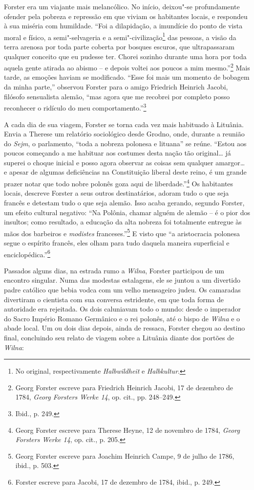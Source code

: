 Forster era um viajante mais melancólico. No início, deixou"-se
profundamente ofender pela pobreza e repressão em que viviam os
habitantes locais, e respondeu à sua miséria com humildade. ``Foi a
dilapidação, a imundície do ponto de vista moral e físico, a
semi"-selvageria e a semi"-civilização\footnote{No original, respectivamente \textit{Halbwildheit} e \textit{Halbkultur}.} das pessoas, a visão da terra arenosa por toda
parte coberta por bosques escuros, que ultrapassaram qualquer conceito
que eu pudesse ter. Chorei sozinho durante uma hora por toda aquela
gente atirada ao abismo -- e depois voltei aos poucos a mim
mesmo.''\footnote{Georg Forster escreve para Friedrich Heinrich Jacobi, 17 de dezembro de 1784, \textit{Georg Forsters Werke 14}, op. cit., pp. 248--249.} Mais tarde, as emoções haviam se modificado. ``Esse foi mais um momento de bobagem da minha parte,'' observou Forster para o amigo
Friedrich Heinrich Jacobi, filósofo sensualista alemão, ``mas agora que
me recobrei por completo posso reconhecer o ridículo do meu
comportamento.''\footnote{Ibid., p. 249.}

A cada dia de sua viagem, Forster se torna cada vez mais habituado à
Lituânia. Envia a Therese um relatório sociológico desde Grodno, onde,
durante a reunião do \textit{Sejm}, o parlamento, ``toda a nobreza polonesa e
lituana'' se reúne. ``Estou aos poucos começando a me habituar aos
costumes desta nação tão original\ldots{} já superei o choque inicial e
posso agora observar as coisas sem qualquer amargor\ldots{} e
apesar de algumas deficiências na Constituição liberal deste reino, é um
grande prazer notar que todo nobre polonês goza aqui de
liberdade.''\footnote{Georg Forster escreve para Therese Heyne, 12 de novembro de 1784, \textit{Georg Forsters Werke 14}, op. cit., p. 205.} Os habitantes locais, descreve Forster a seus outros destinatários,
adoram tudo o que seja francês e detestam tudo o que seja alemão. Isso
acaba gerando, segundo Forster, um efeito cultural negativo: ``Na
Polônia, chamar alguém de alemão -- é o pior dos insultos; como
resultado, a educação da alta nobreza foi totalmente entregue às mãos
dos barbeiros e \textit{modistes} franceses.''\footnote{Georg Forster escreve para Joachim Heinrich Campe, 9 de julho de 1786, ibid., p. 503.} E visto que ``a aristocracia polonesa segue o espírito francês, eles olham para tudo daquela maneira superficial e
enciclopédica.''\footnote{Forster escreve para Jacobi, 17 de dezembro de 1784, ibid., p. 249.}

Passados alguns dias, na estrada rumo a \textit{Wilna}, Forster participou de um
encontro singular. Numa das modestas estalagens, ele se juntou a um
divertido padre católico que bebia vodca com um velho mensageiro judeu.
Os camaradas divertiram o cientista com sua conversa estridente, em que
toda forma de autoridade era rejeitada. Os dois caluniavam todo o mundo:
desde o imperador do Sacro Império Romano Germânico e o rei polonês, até
o bispo de \textit{Wilna} e o abade local. Um ou dois dias depois, ainda de
ressaca, Forster chegou ao destino final, concluindo seu relato de
viagem sobre a Lituânia diante dos portões de \textit{Wilna}:


